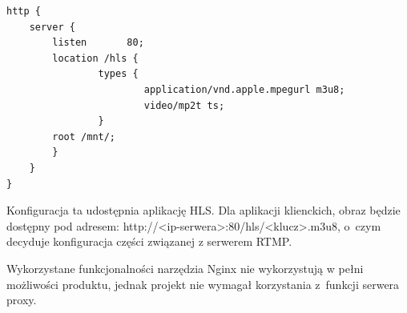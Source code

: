 \begin{verbatim}
http {
    server {
        listen       80;
        location /hls {
                types {
                        application/vnd.apple.mpegurl m3u8;
                        video/mp2t ts;
                }
        root /mnt/;
        }
    }
}
\end{verbatim}

Konfiguracja ta udostępnia aplikację HLS. Dla aplikacji klienckich, obraz będzie dostępny pod adresem: http://<ip-serwera>:80/hls/<klucz>.m3u8, o~czym decyduje konfiguracja części związanej z serwerem RTMP.

Wykorzystane funkcjonalności narzędzia Nginx nie wykorzystują w pełni możliwości produktu, jednak projekt nie wymagał korzystania z~funkcji serwera proxy.
